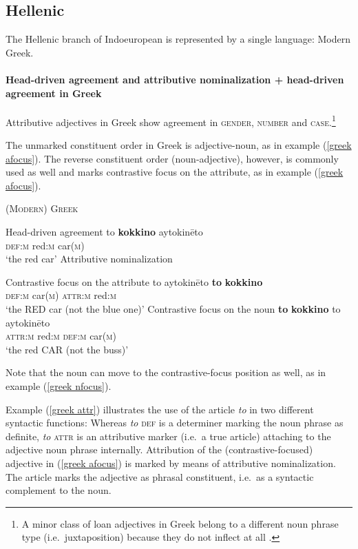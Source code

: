 \subsection{Hellenic}\label{greek synchr}
The Hellenic branch of Indoeuropean is represented by a single language: Modern Greek. 

\paragraph{Head-driven agreement and attributive nominalization + head-driven agreement in Greek}
Attributive adjectives in Greek show agreement in \textsc{gender, number} and \textsc{case}.\footnote{A minor class of loan adjectives in Greek belong to a different noun phrase type (i.e.~juxtaposition) because they do not inflect at all \cite{ruge1986}.}

The unmarked constituent order in Greek is adjective-noun, as in example (\ref{greek afocus}). The reverse constituent order (noun-adjective), however, is commonly used as well and marks contrastive focus on the attribute, as in example (\ref{greek afocus}).
\begin{exe}
\ex \textsc{(Modern) Greek} \citep{ruge1986}
\begin{xlist}
\ex	Head-driven agreement \label{greek agr}
\gll	to			\textbf{kokkino} 	aytokinēto\\
	\textsc{def:m}	red:\textsc{m}	car(\textsc{m})\\
\glt	‘the red car’
\ex	Attributive nominalization \label{greek attr}
\begin{xlist}
\ex	Contrastive focus on the attribute \label{greek afocus}
\gll	to 			aytokinēto		\textbf{to}				\textbf{kokkino}\\
	\textsc{def:m}	car(\textsc{m})	\textsc{attr:m}	red:\textsc{m}\\
\glt	‘the RED car (not the blue one)’
\ex	Contrastive focus on the noun \label{greek nfocus}
\gll	\textbf{to}				\textbf{kokkino}		to		aytokinēto\\
	\textsc{attr:m}	red:\textsc{m}	\textsc{def:m}	car(\textsc{m})\\
\glt	‘the red CAR (not the buss)’
\end{xlist}
\end{xlist}
\end{exe}
Note that the noun can move to the contrastive-focus position as well, as in example (\ref{greek nfocus}).

Example (\ref{greek attr}) illustrates the use of the article \textit{to} in two different syntactic functions: Whereas \textit{to} \textsc{def} is a determiner marking the noun phrase as definite, \textit{to} \textsc{attr} is an attributive marker (i.e.~a true article) attaching to the adjective noun phrase internally. Attribution of the (contrastive-focused) adjective in (\ref{greek afocus}) is marked by means of attributive nominalization. The article marks the adjective as phrasal constituent, i.e.~as a syntactic complement to the noun.

